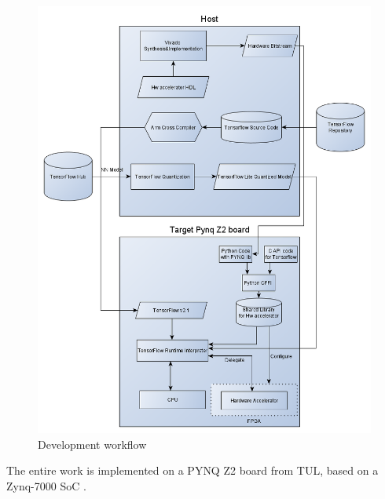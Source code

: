 \begin{figure}[!htbp]
\centering
\captionsetup{justification=centering}
\includegraphics[scale=0.5]{./figure/workflow.png}
\caption{Development workflow}
\label{fig:workflow}
\end{figure}

\newpage
The entire work is implemented on a PYNQ Z2 board from TUL, based on a Zynq-7000 SoC \cite{paper:31}.

